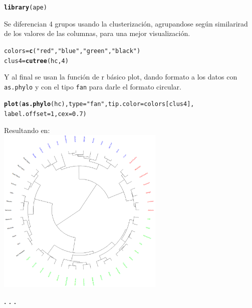 \documentclass{article}\usepackage[]{graphicx}\usepackage[]{color}
\makeatletter
\newcommand{\hlnum}[1]{\textcolor[rgb]{0.686,0.059,0.569}{#1}}%
\newcommand{\hlstr}[1]{\textcolor[rgb]{0.192,0.494,0.8}{#1}}%
\newcommand{\hlstd}[1]{\textcolor[rgb]{0.345,0.345,0.345}{#1}}%
\newcommand{\hlkwb}[1]{\textcolor[rgb]{0.69,0.353,0.396}{#1}}%
\newcommand{\hlkwc}[1]{\textcolor[rgb]{0.333,0.667,0.333}{#1}}%
\newcommand{\hlkwd}[1]{\textcolor[rgb]{0.737,0.353,0.396}{\textbf{#1}}}%
\newenvironment{kframe}{%
 \def\at@end@of@kframe{}%
 \ifinner\ifhmode%
  \def\at@end@of@kframe{\end{minipage}}%
  \begin{minipage}{\columnwidth}%
 \fi\fi%
 \def\FrameCommand##1{\hskip\@totalleftmargin \hskip-\fboxsep
 \colorbox{shadecolor}{##1}\hskip-\fboxsep
     \hskip-\linewidth \hskip-\@totalleftmargin \hskip\columnwidth}%
 \MakeFramed {\advance\hsize-\width
   \@totalleftmargin\z@ \linewidth\hsize
   \@setminipage}}%
 {\par\unskip\endMakeFramed%
 \at@end@of@kframe}
\newenvironment{knitrout}{}{} %
\makeatother
\begin{document}
\begin{knitrout}
\color{fgcolor}\begin{kframe}
\begin{alltt}
\hlkwd{library}\hlstd{(ape)}
\end{alltt}
\end{kframe}
\end{knitrout}
Se diferencian 4 grupos usando la clusterizaci\'on, agrupandose seg\'un similarirad de los valores de las columnas, para una mejor visualizaci\'on.
\begin{knitrout}
\color{fgcolor}\begin{kframe}
\begin{alltt}
\hlstd{colors} \hlkwb{=} \hlkwd{c}\hlstd{(}\hlstr{"red"}\hlstd{,} \hlstr{"blue"}\hlstd{,} \hlstr{"green"}\hlstd{,} \hlstr{"black"}\hlstd{)}
\hlstd{clus4} \hlkwb{=} \hlkwd{cutree}\hlstd{(hc,} \hlnum{4}\hlstd{)}
\end{alltt}
\end{kframe}
\end{knitrout}
Y al final se usan la funci\'on de r b\'asico plot, dando formato a los datos con \texttt{as.phylo} y con el tipo \texttt{fan} para darle el formato circular.
\begin{knitrout}
\color{fgcolor}\begin{kframe}
\begin{alltt}
\hlkwd{plot}\hlstd{(}\hlkwd{as.phylo}\hlstd{(hc),} \hlkwc{type} \hlstd{=} \hlstr{"fan"}\hlstd{,} \hlkwc{tip.color} \hlstd{= colors[clus4],}
     \hlkwc{label.offset} \hlstd{=} \hlnum{1}\hlstd{,} \hlkwc{cex} \hlstd{=} \hlnum{0.7}\hlstd{)}
\end{alltt}
\end{kframe}
\end{knitrout}
\clearpage
Resultando en:~\\
\vbox{
    \centering
    \includegraphics[width=0.6\textwidth]{imag/ape}
}
\begin{center}
\textbf{. . .}
\end{center}
\end{document}
